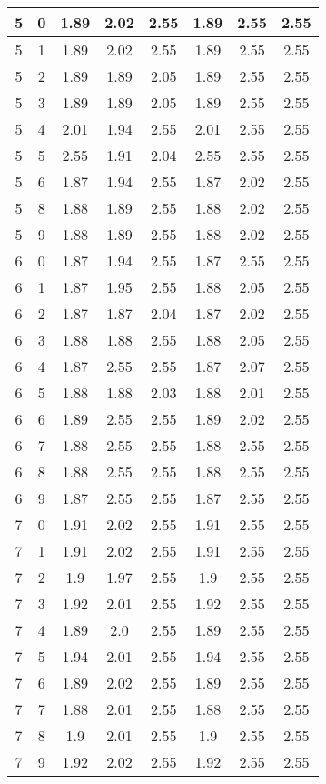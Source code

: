 \begin{longtable}{|c|c||c||c|c||c|c|c|}
	5 & 0 & 1.89 & 2.02 & 2.55 & 1.89 & 2.55 & 2.55 \\ \hline
	5 & 1 & 1.89 & 2.02 & 2.55 & 1.89 & 2.55 & 2.55 \\ \hline
	5 & 2 & 1.89 & 1.89 & 2.05 & 1.89 & 2.55 & 2.55 \\ \hline
	5 & 3 & 1.89 & 1.89 & 2.05 & 1.89 & 2.55 & 2.55 \\ \hline
	5 & 4 & 2.01 & 1.94 & 2.55 & 2.01 & 2.55 & 2.55 \\ \hline
	5 & 5 & 2.55 & 1.91 & 2.04 & 2.55 & 2.55 & 2.55 \\ \hline
	5 & 6 & 1.87 & 1.94 & 2.55 & 1.87 & 2.02 & 2.55 \\ \hline
	5 & 8 & 1.88 & 1.89 & 2.55 & 1.88 & 2.02 & 2.55 \\ \hline
	5 & 9 & 1.88 & 1.89 & 2.55 & 1.88 & 2.02 & 2.55 \\ \hline
	6 & 0 & 1.87 & 1.94 & 2.55 & 1.87 & 2.55 & 2.55 \\ \hline
	6 & 1 & 1.87 & 1.95 & 2.55 & 1.88 & 2.05 & 2.55 \\ \hline
	6 & 2 & 1.87 & 1.87 & 2.04 & 1.87 & 2.02 & 2.55 \\ \hline
	6 & 3 & 1.88 & 1.88 & 2.55 & 1.88 & 2.05 & 2.55 \\ \hline
	6 & 4 & 1.87 & 2.55 & 2.55 & 1.87 & 2.07 & 2.55 \\ \hline
	6 & 5 & 1.88 & 1.88 & 2.03 & 1.88 & 2.01 & 2.55 \\ \hline
	6 & 6 & 1.89 & 2.55 & 2.55 & 1.89 & 2.02 & 2.55 \\ \hline
	6 & 7 & 1.88 & 2.55 & 2.55 & 1.88 & 2.55 & 2.55 \\ \hline
	6 & 8 & 1.88 & 2.55 & 2.55 & 1.88 & 2.55 & 2.55 \\ \hline
	6 & 9 & 1.87 & 2.55 & 2.55 & 1.87 & 2.55 & 2.55 \\ \hline
	7 & 0 & 1.91 & 2.02 & 2.55 & 1.91 & 2.55 & 2.55 \\ \hline
	7 & 1 & 1.91 & 2.02 & 2.55 & 1.91 & 2.55 & 2.55 \\ \hline
	7 & 2 & 1.9 & 1.97 & 2.55 & 1.9 & 2.55 & 2.55 \\ \hline
	7 & 3 & 1.92 & 2.01 & 2.55 & 1.92 & 2.55 & 2.55 \\ \hline
	7 & 4 & 1.89 & 2.0 & 2.55 & 1.89 & 2.55 & 2.55 \\ \hline
	7 & 5 & 1.94 & 2.01 & 2.55 & 1.94 & 2.55 & 2.55 \\ \hline
	7 & 6 & 1.89 & 2.02 & 2.55 & 1.89 & 2.55 & 2.55 \\ \hline
	7 & 7 & 1.88 & 2.01 & 2.55 & 1.88 & 2.55 & 2.55 \\ \hline
	7 & 8 & 1.9 & 2.01 & 2.55 & 1.9 & 2.55 & 2.55 \\ \hline
	7 & 9 & 1.92 & 2.02 & 2.55 & 1.92 & 2.55 & 2.55 \\ \hline
\end{longtable}
